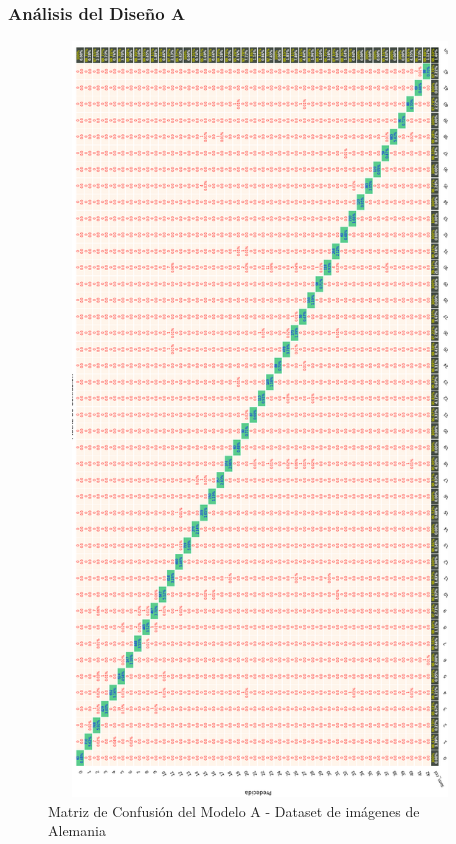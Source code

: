 	 	\subsubsection{Análisis del Diseño A}  
			\begin{figure}[H]
				\includegraphics[width=1\textwidth, height=20cm]{images/desarrollo/testResults/model_A_A} 
				\begin{center}
				\caption{\small{Matriz de Confusión del Modelo A - Dataset de imágenes de Alemania}}
				\vspace{-1em}
				{\small{\fontsize{10}{16.8}\selectfont {Fuente propia}}}
				\end{center}
				\vspace{-1.5em}
			\end{figure}


